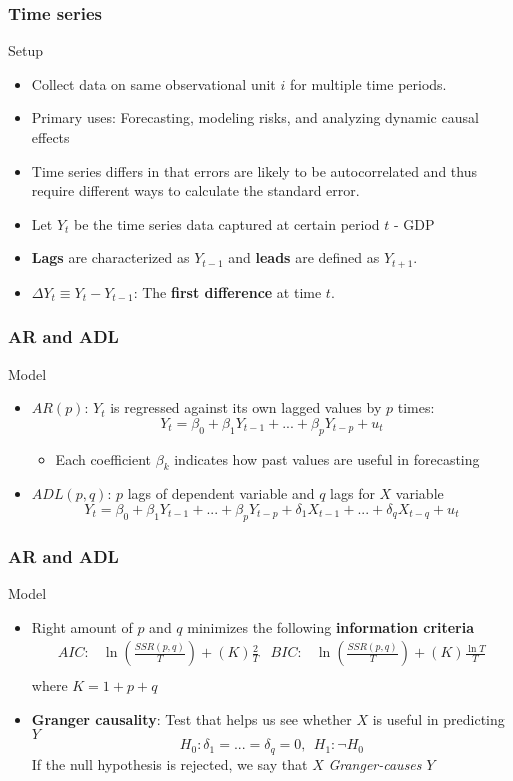 \documentclass[compress]{beamer}
\begin{document}
\begin{frame}
\frametitle{Time series}
Setup
\begin{itemize}
\item Collect data on same observational unit $i$ for multiple time periods. 
\item Primary uses: Forecasting, modeling risks, and analyzing dynamic causal effects
\item Time series differs in that errors are likely to be autocorrelated and thus require different ways to calculate the standard error. 
\item Let $Y_t$ be the time series data captured at certain period $t$ - GDP
\item \textbf{Lags} are characterized as $Y_{t-1}$ and \textbf{leads} are defined as $Y_{t+1}$. 
\item $\Delta Y_{t}\equiv Y_t-Y_{t-1}$: The \textbf{first difference} at time $t$. 
\end{itemize}
\end{frame}

\begin{frame}
\frametitle{AR and ADL}
Model
\begin{itemize}
\item $AR(p)$: $Y_t$ is regressed against its own lagged values by $p$ times: 
\[
Y_t = \beta_0+\beta_1Y_{t-1}+...+\beta_pY_{t-p}+u_t 
\]
\begin{itemize}
\item Each coefficient $\beta_k$ indicates how past values are useful in forecasting
\end{itemize}
\item $ADL(p,q)$: $p$ lags of dependent variable and $q$ lags for $X$ variable
\[
Y_t = \beta_0+\beta_1Y_{t-1}+...+\beta_p Y_{t-p} + \delta_1 X_{t-1}+...+\delta_qX_{t-q}+u_t 
\]
\end{itemize}
\end{frame}

\begin{frame}
\frametitle{AR and ADL}
Model
\begin{itemize}
\item Right amount of $p$ and $q$ minimizes the following \textbf{information criteria}
\[
\begin{aligned}
AIC:& \ln\left(\frac{SSR(p,q)}{T}\right)+(K)\frac{2}{T}&
BIC:& \ln\left(\frac{SSR(p,q)}{T}\right)+(K)\frac{\ln{T}}{T}\\
\end{aligned}
\]
where $K=1+p+q$
\item \textbf{Granger causality}: Test that helps us see whether $X$ is useful in predicting $Y$
\[
H_0: \delta_1 = ... = \delta_q=0, \ \ H_1: \lnot H_0
\]
If the null hypothesis is rejected, we say that $X$ \textit{Granger-causes} $Y$
\end{itemize}
\end{frame}
\end{document}
